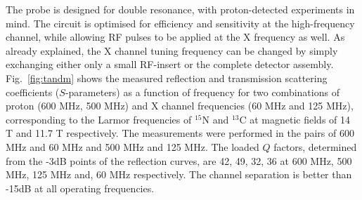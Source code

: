 \documentclass[preprint,5p]{elsarticle}
\newcommand{\fig}[1]{Fig.~\ref{#1}}
\begin{document}
The probe is designed for double resonance, with proton-detected experiments in mind. The circuit is optimised
for efficiency and sensitivity at the high-frequency channel, while allowing RF pulses to be applied
at the X frequency as well. As already explained, the X channel tuning frequency can be changed by simply
 exchanging either only a small RF-insert or the complete detector assembly. 
 \fig{fig:tandm} shows the measured reflection and transmission scattering coefficients ($S$-parameters) as a 
 function of frequency for two combinations of 
 proton (600 MHz, 500 MHz) and X channel frequencies (60 MHz and 125 MHz), 
 corresponding to the Larmor frequencies of $^{15}$N and $^{13}$C at magnetic fields of 14 T and 11.7 T respectively. 
 The measurements were performed in the pairs of 600 MHz and 60 MHz and 500 MHz and 125 MHz. The loaded $Q$ factors,
 determined from the -3dB points of the reflection curves, are 42, 49, 32, 36 at 600 MHz, 500 MHz, 
 125 MHz and, 60 MHz respectively. The channel separation is better than -15dB at all operating frequencies.
 
\end{document}
